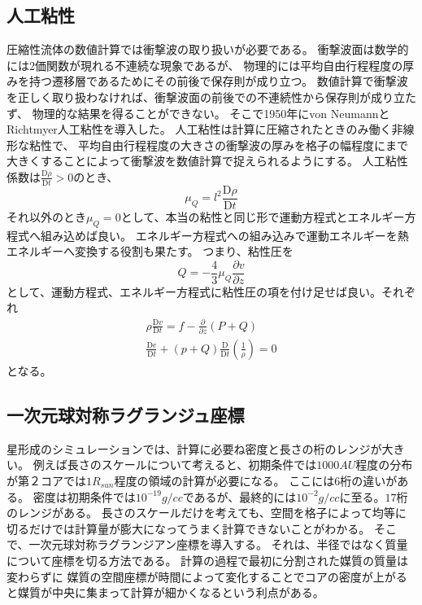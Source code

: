 \documentclass[a4j, dvipdfmx]{jsarticle}
\newcommand{\pder}[2][]{\frac{\partial#1}{\partial#2}}
\newcommand{\Dder}[2][]{\frac{\mathrm{D}#1}{\mathrm{D}#2}}
\newcommand{\beq}{\begin{equation}}
\newcommand{\eeq}{\end{equation}}
\begin{document}
\subsection{人工粘性}
圧縮性流体の数値計算では衝撃波の取り扱いが必要である。
衝撃波面は数学的には2価関数が現れる不連続な現象であるが、
物理的には平均自由行程程度の厚みを持つ遷移層であるためにその前後で保存則が成り立つ。
数値計算で衝撃波を正しく取り扱わなければ、衝撃波面の前後での不連続性から保存則が成り立たず、
物理的な結果を得ることができない。
そこで1950年にvon NeumannとRichtmyer人工粘性を導入した。
人工粘性は計算に圧縮されたときのみ働く非線形な粘性で、
平均自由行程程度の大きさの衝撃波の厚みを格子の幅程度にまで大きくすることによって衝撃波を数値計算で捉えられるようにする。
人工粘性係数は$\Dder[\rho]{t} > 0$のとき、
\beq
\mu_Q = l^2 \Dder[\rho]{t} 
\eeq
それ以外のとき$\mu_Q = 0$として、本当の粘性と同じ形で運動方程式とエネルギー方程式へ組み込めば良い。
エネルギー方程式への組み込みで運動エネルギーを熱エネルギーへ変換する役割も果たす。
つまり、粘性圧を
\beq
Q = - \frac{4}{3} \mu_Q \pder[v]{z}
\eeq
として、運動方程式、エネルギー方程式に粘性圧の項を付け足せば良い。それぞれ
\begin{align}
    \rho \Dder[v]{t} = f - \pder[]{z}(P + Q)\\
    \Dder[e]{t} + (p + Q)\Dder[]{t}\left(\frac{1}{\rho}\right)=0
\end{align}
となる。
\subsection{一次元球対称ラグランジュ座標}
星形成のシミュレーションでは、計算に必要ね密度と長さの桁のレンジが大きい。
例えば長さのスケールについて考えると、初期条件では$1000AU$程度の分布が第２コアでは$1R_{sun}$程度の領域の計算が必要になる。
ここには$6$桁の違いがある。
密度は初期条件では$10^{-19}g/cc$であるが、最終的には$10^{-2}g/cc$に至る。$17$桁のレンジがある。
長さのスケールだけを考えても、空間を格子によって均等に切るだけでは計算量が膨大になってうまく計算できないことがわかる。
そこで、一次元球対称ラグランジアン座標を導入する。
それは、半径ではなく質量について座標を切る方法である。
計算の過程で最初に分割された媒質の質量は変わらずに
媒質の空間座標が時間によって変化することでコアの密度が上がると媒質が中央に集まって計算が細かくなるという利点がある。
\end{document}
